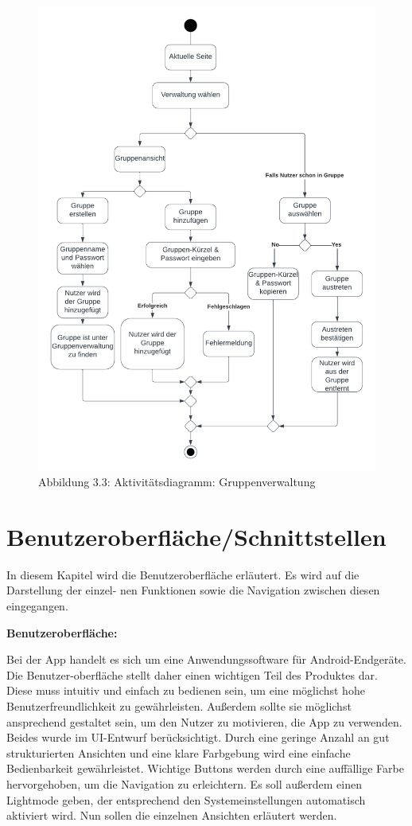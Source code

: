 \documentclass[parskip=full]{scrartcl}
\begin{document}
\begin{figure}[!htp]
    \centering
    \includegraphics{images/section3/ActivityDiagramGroupSettings.png}\\
    Abbildung 3.3: Aktivitätsdiagramm: Gruppenverwaltung
    \label{fig:A33}
\end{figure}
\newpage

\section{Benutzeroberfläche/Schnittstellen}
In diesem Kapitel wird die Benutzeroberfläche erläutert. Es wird auf die Darstellung der einzel- nen Funktionen sowie die Navigation zwischen diesen eingegangen.

\textbf{Benutzeroberfläche:}

Bei der App handelt es sich um eine Anwendungssoftware für Android-Endgeräte. Die Benutzer-oberfläche stellt daher einen wichtigen Teil des Produktes dar. Diese muss intuitiv und einfach zu bedienen sein, um eine möglichst hohe Benutzerfreundlichkeit zu gewährleisten. Außerdem sollte sie möglichst ansprechend gestaltet sein, um den Nutzer zu motivieren, die App zu verwenden. Beides wurde im UI-Entwurf berücksichtigt. Durch eine geringe Anzahl an gut strukturierten Ansichten und eine klare Farbgebung wird eine einfache Bedienbarkeit gewährleistet. Wichtige Buttons werden durch eine auffällige Farbe hervorgehoben, um die Navigation zu erleichtern. Es soll außerdem einen Lightmode geben, der entsprechend den Systemeinstellungen automatisch aktiviert wird. Nun sollen die einzelnen Ansichten erläutert werden.
\end{document}
